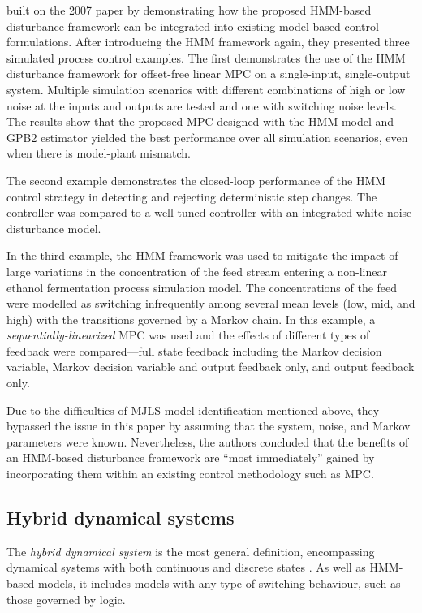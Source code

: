 \cite{wong_realistic_2009} built on the 2007 paper by demonstrating how the proposed \gls{HMM}-based disturbance framework can be integrated into existing model-based control formulations. After introducing the \gls{HMM} framework again, they presented three simulated process control examples. The first demonstrates the use of the \gls{HMM} disturbance framework for offset-free linear \gls{MPC} on a single-input, single-output system. Multiple simulation scenarios with different combinations of high or low noise at the inputs and outputs are tested and one with switching noise levels. The results show that the proposed \gls{MPC} designed with the \gls{HMM} model and \gls{GPB2} estimator yielded the best performance over all simulation scenarios, even when there is model-plant mismatch.

The second example demonstrates the closed-loop performance of the \gls{HMM} control strategy in detecting and rejecting deterministic step changes. The controller was compared to a well-tuned controller with an integrated white noise disturbance model.

In the third example, the \gls{HMM} framework was used to mitigate the impact of large variations in the concentration of the feed stream entering a non-linear ethanol fermentation process simulation model. The concentrations of the feed were modelled as switching infrequently among several mean levels (low, mid, and high) with the transitions governed by a Markov chain. In this example, a \textit{sequentially-linearized} \gls{MPC} \citep{lee_extended_1994} was used and the effects of different types of feedback were compared---full state feedback including the Markov decision variable, Markov decision variable and output feedback only, and output feedback only.

Due to the difficulties of \gls{MJLS} model identification mentioned above, they bypassed the issue in this paper by assuming that the system, noise, and Markov parameters were known. Nevertheless, the authors concluded that the benefits of an \gls{HMM}-based disturbance framework are ``most immediately'' gained by incorporating them within an existing control methodology such as \gls{MPC}.

\subsection{Hybrid dynamical systems} \label{sec:lit-hybrid}

The \textit{hybrid dynamical system} is the most general definition, encompassing dynamical systems with both continuous and discrete states \citep{van_der_schaft_introduction_2000}. As well as \gls{HMM}-based models, it includes models with any type of switching behaviour, such as those governed by logic.

